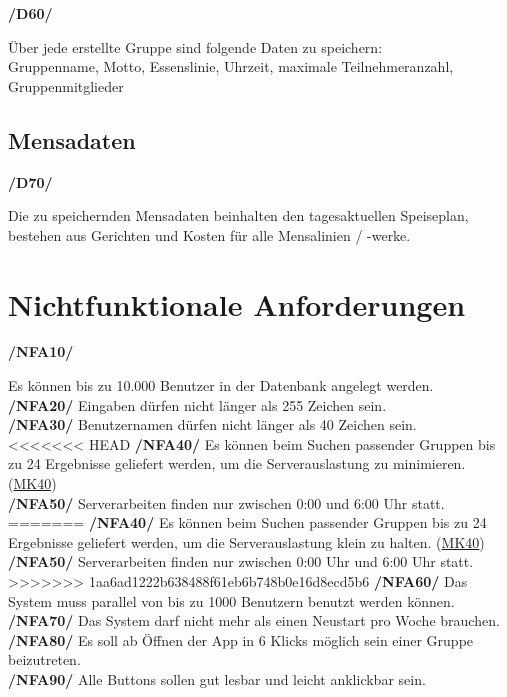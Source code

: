 \documentclass[a4paper]{scrreprt}
\begin{document}
\begin{addmargin}[25pt]{0pt}
\hypertarget{d60}{\textbf{/D60/}} Über jede erstellte Gruppe sind folgende Daten zu speichern:\\
Gruppenname, Motto, Essenslinie, Uhrzeit, maximale Teilnehmeranzahl, Gruppenmitglieder\\
\end{addmargin}

\section{Mensadaten}

\begin{addmargin}[25pt]{0pt}
\hypertarget{d70}{\textbf{/D70/}} Die zu speichernden Mensadaten beinhalten den tagesaktuellen Speiseplan, bestehen aus Gerichten und Kosten für alle Mensalinien / -werke.\\
\end{addmargin}



\chapter{Nichtfunktionale Anforderungen}

\begin{addmargin}[25pt]{0pt} 

\hypertarget{nfa10}{\textbf{/NFA10/}} Es können bis zu 10.000 Benutzer in der Datenbank angelegt werden.\\
\hypertarget{nfa20}{\textbf{/NFA20/}} Eingaben dürfen nicht länger als 255 Zeichen sein.\\
\hypertarget{nfa30}{\textbf{/NFA30/}} Benutzernamen dürfen nicht länger als 40 Zeichen sein.\\
<<<<<<< HEAD
\hypertarget{nfa40}{\textbf{/NFA40/}} Es können beim Suchen passender Gruppen bis zu 24 Ergebnisse geliefert werden, um die Serverauslastung zu minimieren. (\hyperlink{m40}{MK40})\\
\hypertarget{nfa50}{\textbf{/NFA50/}} Serverarbeiten finden nur zwischen 0:00 und 6:00 Uhr statt.\\
=======
\hypertarget{nfa40}{\textbf{/NFA40/}} Es können beim Suchen passender Gruppen bis zu 24 Ergebnisse geliefert werden, um die Serverauslastung klein zu halten. (\hyperlink{m40}{MK40})\\
\hypertarget{nfa50}{\textbf{/NFA50/}} Serverarbeiten finden nur zwischen 0:00 Uhr und 6:00 Uhr statt.\\
>>>>>>> 1aa6ad1222b638488f61eb6b748b0e16d8ecd5b6
\hypertarget{nfa60}{\textbf{/NFA60/}} Das System muss parallel von bis zu 1000 Benutzern benutzt werden können.\\
\hypertarget{nfa70}{\textbf{/NFA70/}} Das System darf nicht mehr als einen Neustart pro Woche brauchen.\\
\hypertarget{nfa80}{\textbf{/NFA80/}} Es soll ab Öffnen der App in 6 Klicks möglich sein einer Gruppe beizutreten.\\
\hypertarget{nfa90}{\textbf{/NFA90/}} Alle Buttons sollen gut lesbar und leicht anklickbar sein.\\

\end{addmargin}
\end{document}
